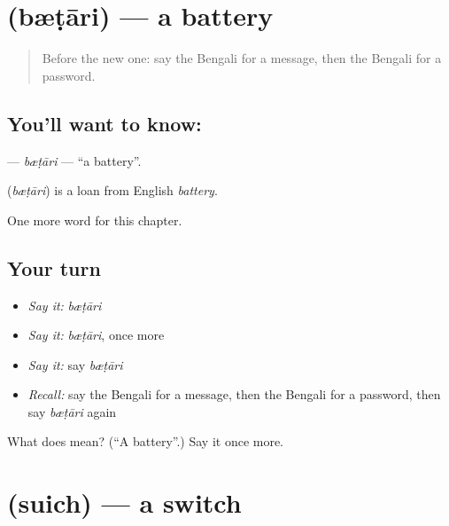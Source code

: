 \section[\texorpdfstring{\bn{ব্যাটারি} (bæṭāri)}{ব্যাটারি (bæṭāri)}]{ (bæṭāri) — a battery}

\label{lesson:BN-C258-btari}



\begin{quote}
Before the new one: say the Bengali for a message, then the Bengali for a password.
\end{quote}

\subsection*{You'll want to know: }
\textbf{} — \emph{bæṭāri} — \textquotedblleft{}a battery\textquotedblright{}.

\begin{cousinweb}
\textbf{} (\emph{bæṭāri}) is a loan from English \emph{battery}.
\end{cousinweb}

\begin{grammarlens}[title={What you've built}]
One more word for this chapter.
\end{grammarlens}

\subsection*{Your turn}
\begin{itemize}
\raggedright
  \item \emph{Say it:} \emph{bæṭāri}
  \item \emph{Say it:} \emph{bæṭāri}, once more
  \item \emph{Say it:} say \emph{bæṭāri}
  \item \emph{Recall:} say the Bengali for a message, then the Bengali for a password, then say \emph{bæṭāri} again
\end{itemize}

\begin{tcolorbox}[breakable,colback=teal!4,colframe=teal!35!black,title={Before you move on}]
What does  mean? (\textquotedblleft{}A battery\textquotedblright{}.) Say it once more.
\end{tcolorbox}
\section[\texorpdfstring{\bn{সুইচ} (suich)}{সুইচ (suich)}]{ (suich) — a switch}

